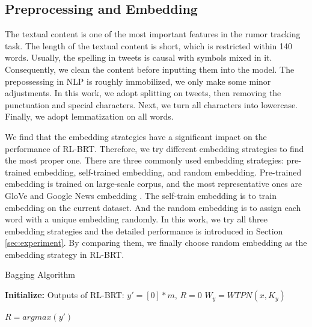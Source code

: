 \subsection{Preprocessing and Embedding}
\label{sec:process_embedding}
The textual content is one of the most important features in the rumor tracking task. The length of the textual content is short, which is restricted within 140 words. Usually, the spelling in tweets is causal with symbols mixed in it. Consequently, we clean the content before inputting them into the model. The prepossessing in NLP is roughly immobilized, we only make some minor adjustments. In this work, we adopt splitting on tweets, then removing the punctuation and special characters. Next, we turn all characters into lowercase. Finally, we adopt lemmatization on all words.

We find that the embedding strategies have a significant impact on the performance of RL-BRT. Therefore, we try different embedding strategies to find the most proper one. There are three commonly used embedding strategies: pre-trained embedding, self-trained embedding, and random embedding. Pre-trained embedding is trained on large-scale corpus, and the most representative ones are GloVe \cite{DBLP:conf/emnlp/PenningtonSM14} and Google News embedding \cite{googlenews}. The self-train embedding is to train embedding on the current dataset. And the random embedding is to assign each word with a unique embedding randomly. In this work, we try all three embedding strategies and the detailed performance is introduced in Section \ref{sec:experiment}. By comparing them, we finally choose random embedding as the embedding strategy in RL-BRT.

\begin{algorithm}[tbp]
	\caption{Bagging Algorithm}
	\label{algorithm:RL-BRT}
	\LinesNumbered %
	\textbf{Initialize:} Outputs of RL-BRT: $y' = [0]*m$, $R = 0$ \;
	$W_y =  WTPN(x, K_y)$ \;
	
	$R = argmax(y')$
\end{algorithm}

